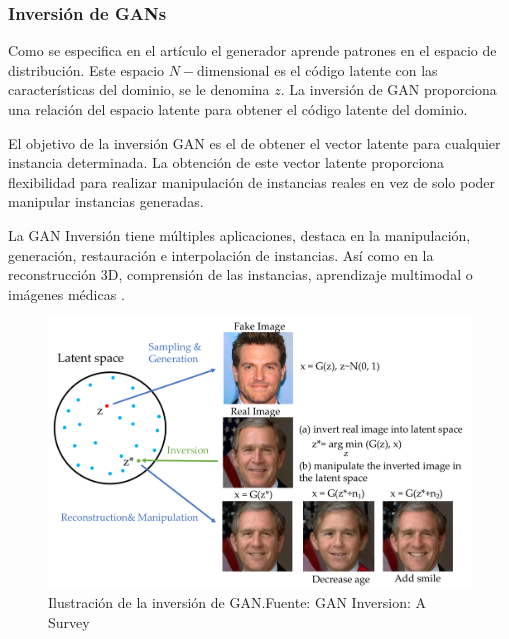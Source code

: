 
\subsubsection{Inversión de GANs}
\label{ch:2:GAN-inversion}

Como se especifica en el artículo \cite{GANInversionSurvey-xia2022gan} el generador aprende patrones en el espacio de distribución. Este espacio ${N-\text{dimensional}}$ es el código latente con las características del dominio, se le denomina ${z}$. La inversión de \gls{GAN} proporciona una relación del espacio latente para obtener el código latente del dominio.

El objetivo de la inversión \gls{GAN} es el de obtener el vector latente para cualquier instancia determinada. La obtención de este vector latente proporciona flexibilidad para realizar manipulación de instancias reales en vez de solo poder manipular instancias generadas.

La \gls{GAN} Inversión tiene múltiples aplicaciones, destaca en la manipulación, generación, restauración e interpolación de instancias. Así como en la reconstrucción 3D, comprensión de las instancias, aprendizaje multimodal o imágenes médicas \cite{GANInversionSurvey-xia2022gan}.

\begin{figure}[H]
    \centering
    \includegraphics[width=0.5\linewidth]{figures/chapter02/overview.pdf}
    \caption{Ilustración de la inversión de GAN.\newline{}Fuente: GAN Inversion: A Survey \cite{GANInversionSurvey-xia2022gan}}
    \label{fig:gan-inversion}
\end{figure}

